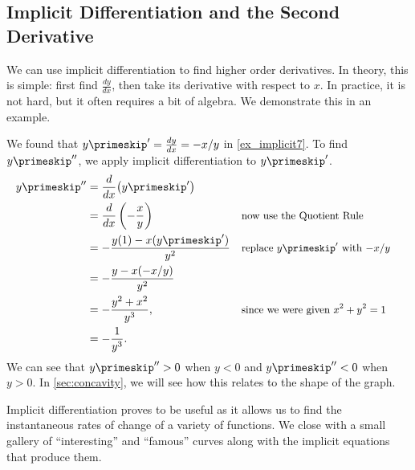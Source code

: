 \subsection{Implicit Differentiation and the Second Derivative}

We can use implicit differentiation to find higher order derivatives. In theory, this is simple: first find $\frac{dy}{dx}$, then take its derivative with respect to $x$. In practice, it is not hard, but it often requires a bit of algebra. We demonstrate this in an example.

{We found that $y\primeskip' = \frac{dy}{dx} = -x/y$ in \autoref{ex_implicit7}. To find $y\primeskip''$, we apply implicit differentiation to $y\primeskip'$.
\begin{align*}
	y\primeskip''
	&= \frac{d}{dx}\big(y\primeskip'\big) \\
	&= \frac{d}{dx}\left(-\frac xy\right) && \text{\small now use the Quotient Rule} \\
	&= -\frac{y(1) - x(y\primeskip')}{y^2} && \text{\small replace $y\primeskip'$ with $-x/y$} \\
	&= -\frac{y-x(-x/y)}{y^2}\\
	&= -\frac{y^2+x^2}{y^3}, && \text{\small since we were given $x^2+y^2=1$} \\
	&= -\frac1{y^3}.
\end{align*}
We can see that $y\primeskip''>0$ when $y<0$ and $y\primeskip''<0$ when $y>0$. In \autoref{sec:concavity}, we will see how this relates to the shape of the graph.}

Implicit differentiation proves to be useful as it allows us to find the instantaneous rates of change of a variety of functions.
We close with a small gallery of ``interesting'' and ``famous'' curves along with the implicit equations that produce them.

